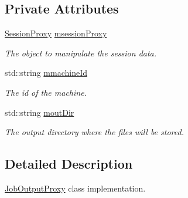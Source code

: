 \subsection*{Private Attributes}
\begin{DoxyCompactItemize}
\item 
\hypertarget{classJobOutputProxy_a6f0f045935267e8d242813c4299ae099}{
\hyperlink{classSessionProxy}{SessionProxy} \hyperlink{classJobOutputProxy_a6f0f045935267e8d242813c4299ae099}{msessionProxy}}
\label{classJobOutputProxy_a6f0f045935267e8d242813c4299ae099}

\begin{DoxyCompactList}\small\item\em The object to manipulate the session data. \item\end{DoxyCompactList}\item 
\hypertarget{classJobOutputProxy_ab698b525683b1c76d58be81e82336830}{
std::string \hyperlink{classJobOutputProxy_ab698b525683b1c76d58be81e82336830}{mmachineId}}
\label{classJobOutputProxy_ab698b525683b1c76d58be81e82336830}

\begin{DoxyCompactList}\small\item\em The id of the machine. \item\end{DoxyCompactList}\item 
\hypertarget{classJobOutputProxy_a2d864d915f82bd34e8c9453170a1cb35}{
std::string \hyperlink{classJobOutputProxy_a2d864d915f82bd34e8c9453170a1cb35}{moutDir}}
\label{classJobOutputProxy_a2d864d915f82bd34e8c9453170a1cb35}

\begin{DoxyCompactList}\small\item\em The output directory where the files will be stored. \item\end{DoxyCompactList}\end{DoxyCompactItemize}


\subsection{Detailed Description}
\hyperlink{classJobOutputProxy}{JobOutputProxy} class implementation. 

